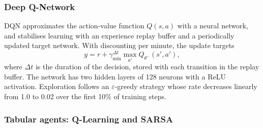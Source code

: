 \documentclass[11pt,a4paper]{article}
\newif\ifrevmarks
\newcommand{\revtag}[1]{\ifrevmarks\textsuperscript{\textcolor{red!70!black}{\scriptsize[#1]}}\fi}
\newcommand{\rev}[2]{\ifrevmarks{\color{revcolor}#2}\revtag{#1}\else#2\fi}
\begin{document}
\subsubsection{Deep Q-Network}

\rev{Bibliography, M14, v3}{DQN \cite{Mnih2015} approximates the action-value function $Q(s,a)$ with a neural network, and stabilises learning with an experience replay buffer and a periodically updated target network. With discounting per minute, the update targets}
\begin{equation}
y = r + \gamma_{\min}^{\Delta t} \max_{a'} Q_{\theta^-}(s', a') ,
\end{equation}
\rev{v3}{where $\Delta t$ is the duration of the decision, stored with each transition in the replay buffer.} The network has two hidden layers of 128 neurons with a ReLU activation. \rev{v3}{Exploration follows an $\varepsilon$-greedy strategy whose rate decreases linearly from 1.0 to 0.02 over the first 10\% of training steps.}

\subsubsection{Tabular agents: Q-Learning and SARSA}
\label{sec:tabular}
\end{document}
